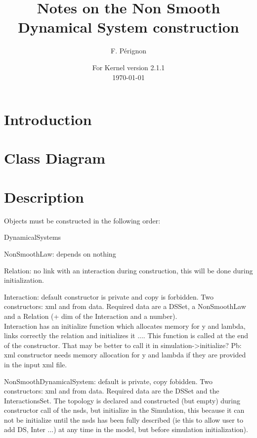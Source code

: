 \documentclass[10pt]{article}
\begin{document}
\thispagestyle{empty}
\title{Notes on the Non Smooth Dynamical System construction}
\author{F. P\'erignon}

\date{For Kernel version 2.1.1 \\
 \today}
\maketitle

\pagestyle{fancy}

\section{Introduction}

\section{Class Diagram}

\section{Description}

Objects must be constructed in the following order: 
\bei
\item DynamicalSystems
\item NonSmoothLaw: depends on nothing
\item Relation: no link with an interaction during construction, this will be done during initialization. 
\item Interaction: default constructor is private and copy is forbidden. Two constructors: xml and from data. Required data are a DSSet, a NonSmoothLaw and
a Relation (+ dim of the Interaction and a number). \\
Interaction has an initialize function which allocates memory for y and lambda, links correctly the relation and initializes it .... This function is called at the 
end of the constructor. That may be better to call it in simulation->initialize? Pb: xml constructor needs memory allocation for y and lambda if they are
provided in the input xml file. 
\item NonSmoothDynamicalSystem: default is private, copy fobidden. Two constructors: xml and from data. Required data are the DSSet and the InteractionsSet.
The topology is declared and constructed (but empty) during constructor call of the nsds, but initialize in the Simulation, this because it can not be initialize until the nsds has been fully described (ie this to allow user to add DS, Inter ...) at any time in the model, but before simulation initialization). 
\end{document}
